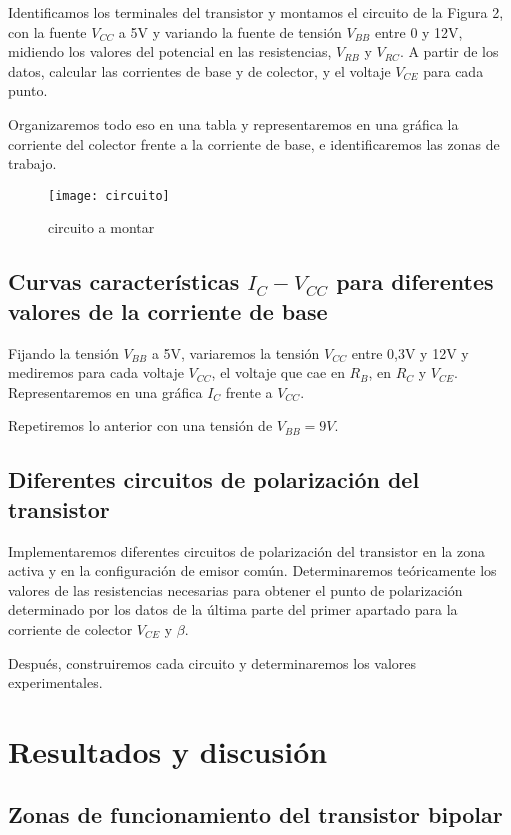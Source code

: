 \documentclass[a4paper,12pt,spanish]{article}
\begin{document}
Identificamos los terminales del transistor y montamos el circuito de la Figura 2, con la fuente $V_{CC}$ a 5V y variando la fuente de tensión $V_{BB}$ entre 0 y 12V, midiendo los valores del potencial en las resistencias, $V_{RB}$ y $V_{RC}$. A partir de los datos, calcular las corrientes de base y de colector, y el voltaje $V_{CE}$ para cada punto.

Organizaremos todo eso en una tabla y representaremos en una gráfica la corriente del colector frente a la corriente de base, e identificaremos las zonas de trabajo.


\begin{figure}[H]
	\centering
	\texttt{[image: circuito]}
	\caption{circuito a montar}
	\label{fig:circuito}
\end{figure}



\subsection{Curvas características $I_C - V_{CC}$ para diferentes valores de la corriente de base}

Fijando la tensión $V_{BB}$ a 5V, variaremos la tensión $V_{CC}$ entre 0,3V y 12V y mediremos para cada voltaje $V_{CC}$, el voltaje que cae en $R_B$, en $R_C$ y $V_{CE}$. 
Representaremos en una gráfica $I_C$ frente a $V_{CC}$.

Repetiremos lo anterior con una tensión de $V_{BB}= 9 \si{V}$.

\subsection{Diferentes circuitos de polarización del transistor}

Implementaremos diferentes circuitos de polarización del transistor en la zona activa y en la configuración de emisor común. Determinaremos teóricamente los valores de las resistencias necesarias para obtener el punto de polarización determinado por los datos de la última parte del primer apartado para la corriente de colector $V_{CE}$ y $\beta$.

Después, construiremos cada circuito y determinaremos los valores experimentales.


\section{Resultados y discusión}

\subsection{Zonas de funcionamiento del transistor bipolar}
\end{document}
